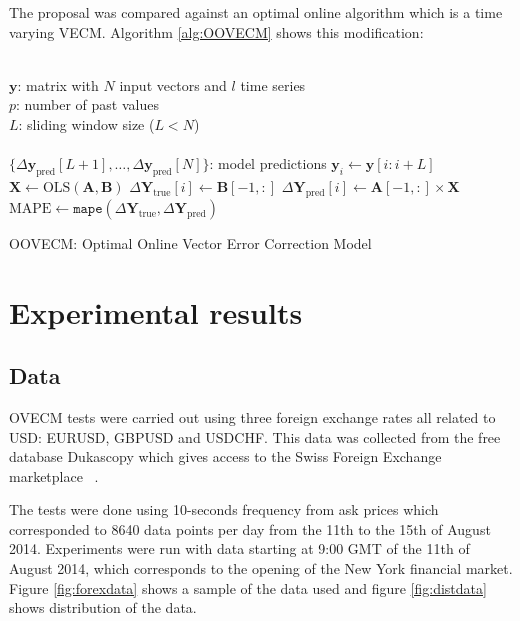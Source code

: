 \documentclass[twocolumn]{svjour3}          %
\begin{document}
The proposal was compared against an optimal online algorithm which is a time varying
VECM. Algorithm \ref{alg:OOVECM} shows this modification:
\begin{algorithm}[ht]
\begin{algorithmic}[1]
\REQUIRE $\,$ \\
$\mathbf{y}$: matrix with $N$ input vectors and $l$ time series\\
$p$: number of past values \\
$L$: sliding window size ($L<N$) \\
\ENSURE  $\,$ \\
$\{\Delta \mathbf{y}_{\text{pred}}[L+1],\dots,\Delta \mathbf{y}_{\text{pred}}[N]\}$: model predictions 
    \STATE $\mathbf{y}_i \gets \mathbf{y}[i:i+L]$
    \STATE $\mathbf{X} \gets \text{OLS} (\mathbf{A},\mathbf{B})$%
    \STATE $\Delta \mathbf{Y}_{\text{true}}[i] \gets \mathbf{B}[-1,:]$
    \STATE $\Delta \mathbf{Y}_{\text{pred}}[i] \gets \mathbf{A}[-1,:] \times \mathbf{X}$
\ENDFOR
    \STATE $\text{MAPE} \gets \texttt{mape}(\Delta \mathbf{Y}_{\text{true}}, \Delta
    \mathbf{Y}_{\text{pred}})$
\end{algorithmic}
\caption{OOVECM: Optimal Online Vector Error Correction Model}
\label{alg:OOVECM}
\end{algorithm}

\section{Experimental results}
\label{sec:results}
\subsection{Data} \label{sec:unitroot}

OVECM tests were carried out using three foreign exchange rates all related to
USD: EURUSD, GBPUSD and USDCHF. This data was collected from the free
database Dukascopy which gives access to the Swiss Foreign Exchange marketplace
~\cite{Dukascopy2014}.

The tests were done using 10-seconds frequency from ask prices which
corresponded to 8640 data points per day from the 11th to the 15th of August
2014. 
Experiments were run with data starting at 9:00 GMT of the 11th of August 2014,
which corresponds to the opening of the New York financial market. Figure \ref{fig:forexdata}  shows a sample of the data used and figure \ref{fig:distdata} shows distribution of the data.
\end{document}
